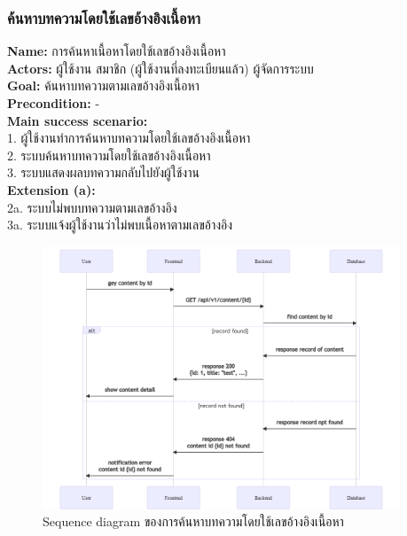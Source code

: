 \documentclass[12pt,oneside,openright,a4paper]{cpe-thai-project}
\begin{document}
\begin{itemize}
\subsubsection{ค้นหาบทความโดยใช้เลขอ้างอิงเนื้อหา}
\textbf{Name: }การค้นหาเนื้อหาโดยใช้เลขอ้างอิงเนื้อหา \\
\textbf{Actors: }ผู้ใช้งาน สมาชิก (ผู้ใช้งานที่ลงทะเบียนแล้ว) ผู้จัดการระบบ \\
\textbf{Goal: }ค้นหาบทความตามเลขอ้างอิงเนื้อหา \\
\textbf{Precondition: }- \\
\textbf{Main success scenario: } \\
  \hspace*{0.5cm}1. ผู้ใช้งานทำการค้นหาบทความโดยใช้เลขอ้างอิงเนื้อหา \\
  \hspace*{0.5cm}2. ระบบค้นหาบทความโดยใช้เลขอ้างอิงเนื้อหา \\
  \hspace*{0.5cm}3. ระบบแสดงผลบทความกลับไปยังผู้ใช้งาน  \\
\textbf{Extension (a): } \\
  \hspace*{0.5cm}2a. ระบบไม่พบบทความตามเลขอ้างอิง \\
  \hspace*{0.5cm}3a. ระบบแจ้งผู้ใช้งานว่าไม่พบเนื้อหาตามเลขอ้างอิง \\ 
\begin{figure}[!ht]\centering
  \includegraphics[width=0.95\textwidth]{./img/seq_searchid.png}
  \caption{Sequence diagram ของการค้นหาบทความโดยใช้เลขอ้างอิงเนื้อหา}\label{fig:seq_content_id} 
\end{figure} 

\end{itemize}
\end{document}
